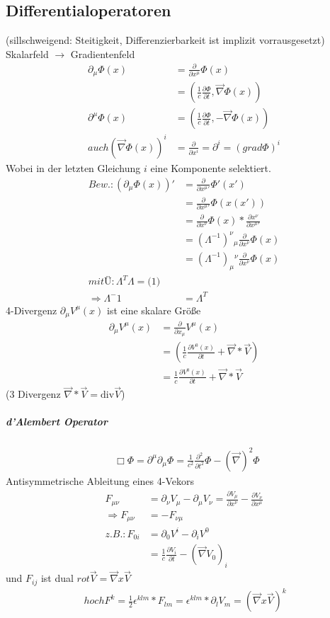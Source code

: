 \documentclass[a4paper]{article}
\newcommand*\dalembert{\mathop{}\!\mathbin\Box}
\begin{document}
\subsection{Differentialoperatoren}
(sillschweigend: Steitigkeit, Differenzierbarkeit ist implizit vorrausgesetzt)
Skalarfeld $\rightarrow$ Gradientenfeld
\begin{align}
\partial_\mu\Phi(x)&=\frac{\partial}{\partial x^\mu}\Phi(x)\\
&=(\frac{1}{c}\frac{\partial\Phi}{\partial t},\vec{\nabla}\Phi(x))\\
\partial^\mu\Phi(x)&=(\frac{1}{c}\frac{\partial\Phi}{\partial
t},-\vec{\nabla}\Phi(x))\\
auch (\vec{\nabla}\Phi(x))^i&=\frac{\partial}{\partial
x^i}=\partial^i=(grad\Phi)^i
\end{align}
Wobei in der letzten Gleichung $i$ eine Komponente selektiert.
\begin{align}
Bew.:(\partial_\mu\Phi(x)){}'&=\frac{\partial}{\partial x^\mu{}'}\Phi{}'(x{}')\\
&=\frac{\partial}{\partial x^\mu{}'}\Phi(x(x{}'))\\
&=\frac{\partial}{\partial x^\nu}\Phi(x)*\frac{\partial x^\nu}{\partial
x^\mu{}'}\\ 
&=(\Lambda^{-1})^\nu{}_\mu\frac{\partial}{\partial x^\nu}\Phi(x)\\
&=(\Lambda^{-1})_\mu{}^\nu\frac{\partial}{\partial x^\nu}\Phi(x)\\
mit Ü: \Lambda^T\Lambda=\mathbb(1)\\
\Rightarrow \Lambda^-1&=\Lambda^T
\end{align}
4-Divergenz $\partial_\mu V^\mu(x)$ ist eine skalare Größe
\begin{align}
\partial_\mu V^\mu(x)&=\frac{\partial}{\partial x_\mu} V^\mu(x)\\
&=(\frac{1}{c}\frac{\partial V^0(x)}{\partial t}+\vec{\nabla}*\vec{V})\\
&=\frac{1}{c}\frac{\partial V^0(x)}{\partial t}+\vec{\nabla}*\vec{V}
\end{align}
(3 Divergenz $\vec{\nabla}*\vec{V}=\text{div}\vec{V}$)\\
\subparagraph{d'Alembert Operator}
\begin{align}
\dalembert\Phi=\partial^\mu\partial_\mu\Phi=\frac{1}{c^2}\frac{\partial^2}{\partial
t^2} \Phi - (\vec{\nabla})^2\Phi
\end{align} 
Antisymmetrische Ableitung eines 4-Vekors
\begin{align}
F_{\mu\nu}&=\partial_\nu V_\mu-\partial_\mu V_\nu= \frac{\partial
V_\mu}{\partial x^\nu}-\frac{\partial V_\nu}{\partial x^\mu} \\
\Rightarrow F_{\mu\nu}&=-F_{\nu\mu}\\
z.B.: F_{0i}&=\partial_0 V^i-\partial_i V^0\\
&=\frac{1}{c}\frac{\partial V_i}{\partial t}-(\vec{\nabla}V_0)_i
\end{align}
und $F_{ij}$ ist dual $rot\vec{V}=\vec{\nabla} x \vec{V}$\\
\begin{align}
~hochF^k=\frac{1}{2}\epsilon^{klm}*F_{lm}=\epsilon^{klm}*\partial_l
V_m=(\vec{\nabla}x\vec{V})^k
\end{align}
\end{document}
